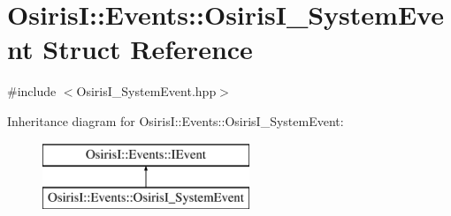 \hypertarget{struct_osiris_i_1_1_events_1_1_osiris_i___system_event}{\section{Osiris\-I\-:\-:Events\-:\-:Osiris\-I\-\_\-\-System\-Event Struct Reference}
\label{struct_osiris_i_1_1_events_1_1_osiris_i___system_event}
}


{\ttfamily \#include $<$Osiris\-I\-\_\-\-System\-Event.\-hpp$>$}

Inheritance diagram for Osiris\-I\-:\-:Events\-:\-:Osiris\-I\-\_\-\-System\-Event\-:\begin{figure}[H]
\begin{center}
\leavevmode
\includegraphics[height=2.000000cm]{struct_osiris_i_1_1_events_1_1_osiris_i___system_event}
\end{center}
\end{figure}
